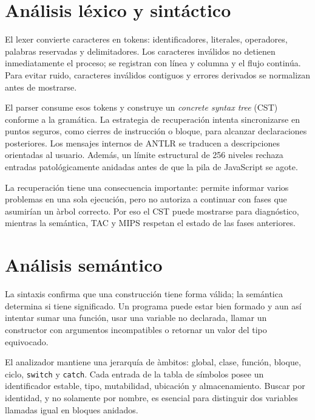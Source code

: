 \documentclass[11pt,letterpaper,oneside]{report}
\newcommand{\codigo}[1]{\texttt{#1}}
\begin{document}
\section{An\'alisis l\'exico y sint\'actico}

El lexer convierte caracteres en tokens: identificadores, literales, operadores, palabras reservadas y delimitadores. Los caracteres inv\'alidos no detienen inmediatamente el proceso; se registran con l\'inea y columna y el flujo contin\'ua. Para evitar ruido, caracteres inv\'alidos contiguos y errores derivados se normalizan antes de mostrarse.

El parser consume esos tokens y construye un \emph{concrete syntax tree} (CST) conforme a la gram\'atica. La estrategia de recuperaci\'on intenta sincronizarse en puntos seguros, como cierres de instrucci\'on o bloque, para alcanzar declaraciones posteriores. Los mensajes internos de ANTLR se traducen a descripciones orientadas al usuario. Adem\'as, un l\'imite estructural de 256 niveles rechaza entradas patol\'ogicamente anidadas antes de que la pila de JavaScript se agote.

La recuperaci\'on tiene una consecuencia importante: permite informar varios problemas en una sola ejecuci\'on, pero no autoriza a continuar con fases que asumir\'ian un \`arbol correcto. Por eso el CST puede mostrarse para diagn\'ostico, mientras la sem\'antica, TAC y MIPS respetan el estado de las fases anteriores.

\section{An\'alisis sem\'antico}

La sintaxis confirma que una construcci\'on tiene forma v\'alida; la sem\'antica determina si tiene significado. Un programa puede estar bien formado y aun as\'i intentar sumar una funci\'on, usar una variable no declarada, llamar un constructor con argumentos incompatibles o retornar un valor del tipo equivocado.

El analizador mantiene una jerarqu\'ia de \`ambitos: global, clase, funci\'on, bloque, ciclo, \codigo{switch} y \codigo{catch}. Cada entrada de la tabla de s\'imbolos posee un identificador estable, tipo, mutabilidad, ubicaci\'on y almacenamiento. Buscar por identidad, y no solamente por nombre, es esencial para distinguir dos variables llamadas igual en bloques anidados.
\end{document}

